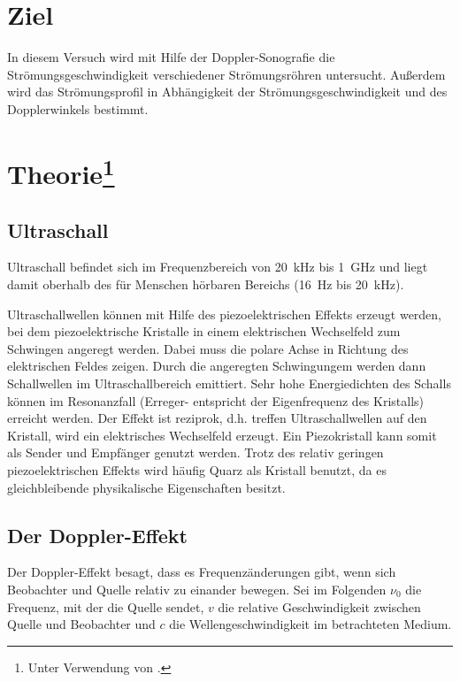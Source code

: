 \section{Ziel}
In diesem Versuch wird mit Hilfe der Doppler-Sonografie die Strömungsgeschwindigkeit verschiedener 
Strömungsröhren untersucht.
Außerdem wird das Strömungsprofil in Abhängigkeit der Strömungsgeschwindigkeit und des Dopplerwinkels bestimmt.




\section[Theorie]{Theorie\footnote[1]{Unter Verwendung von \cite{man:us3}.}}
\subsection{Ultraschall}
Ultraschall befindet sich im Frequenzbereich von \qty{20}{\kilo\hertz} bis \qty{1}{\giga\hertz} und liegt damit oberhalb des für Menschen
hörbaren Bereichs (\qty{16}{\hertz} bis \qty{20}{\kilo\hertz}).

\noindent
Ultraschallwellen können mit Hilfe des piezoelektrischen Effekts erzeugt werden,
bei dem piezoelektrische Kristalle in einem elektrischen Wechselfeld zum Schwingen angeregt werden.
Dabei muss die polare Achse in Richtung des elektrischen Feldes zeigen.
Durch die angeregten Schwingungem werden dann Schallwellen im Ultraschallbereich emittiert.
Sehr hohe Energiedichten des Schalls können im Resonanzfall (Erreger- entspricht der Eigenfrequenz des Kristalls) erreicht werden.
Der Effekt ist reziprok, d.h. treffen Ultraschallwellen auf den Kristall, wird ein elektrisches Wechselfeld erzeugt.
Ein Piezokristall kann somit als Sender und Empfänger genutzt werden.
Trotz des relativ geringen piezoelektrischen Effekts wird häufig Quarz als Kristall benutzt, da es gleichbleibende physikalische 
Eigenschaften besitzt.




\subsection{Der Doppler-Effekt}
Der Doppler-Effekt besagt, dass es Frequenzänderungen gibt, wenn sich Beobachter und Quelle relativ zu einander bewegen.
Sei im Folgenden $\nu_0$ die Frequenz, mit der die Quelle sendet, $v$ die relative Geschwindigkeit zwischen Quelle und Beobachter
und $c$ die Wellengeschwindigkeit im betrachteten Medium.

